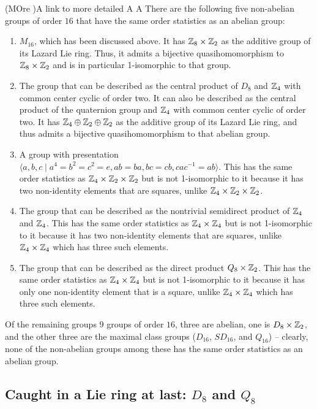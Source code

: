 \documentclass[10pt]{amsart}
\begin{document}
(MOre )A link to more detailed A A
There are the following five non-abelian groups of order $16$ that
have the same order statistics as an abelian group:

\begin{enumerate}
\item $M_{16}$, which has been discussed above. It has $\mathbb{Z}_8 \times
  \mathbb{Z}_2$ as the additive group of its Lazard Lie ring. Thus, it admits
  a bijective quasihomomorphism to $\mathbb{Z}_8 \times \mathbb{Z}_2$ and is in
  particular 1-isomorphic to that group.
\item The group that can be described as the central product of $D_8$
  and $\mathbb{Z}_4$ with common center cyclic of order two. It can also be
  described as the central product of the quaternion group and $\mathbb{Z}_4$
  with common center cyclic of order two. It has $\mathbb{Z}_4 \oplus \mathbb{Z}_2
  \oplus \mathbb{Z}_2$ as the additive group of its Lazard Lie ring, and thus
  admits a bijective quasihomomorphism to that abelian group.
\item A group with presentation $\langle a,b,c \mid a^4 = b^2 =
  c^2 = e, ab = ba, bc = cb, cac^{-1} = ab \rangle$. This has the same
  order statistics as $\mathbb{Z}_4 \times \mathbb{Z}_2 \times \mathbb{Z}_2$ but is not
  1-isomorphic to it because it has two non-identity elements that are
  squares, unlike $\mathbb{Z}_4 \times \mathbb{Z}_2 \times \mathbb{Z}_2$.
\item The group that can be described as the nontrivial semidirect
  product of $\mathbb{Z}_4$ and $\mathbb{Z}_4$. This has the same order statistics as
  $\mathbb{Z}_4 \times \mathbb{Z}_4$ but is not 1-isomorphic to it because it has two
  non-identity elements that are squares, unlike $\mathbb{Z}_4 \times \mathbb{Z}_4$
  which has three such elements.
\item The group that can be described as the direct product $Q_8
  \times \mathbb{Z}_2$. This has the same order statistics as $\mathbb{Z}_4 \times
  \mathbb{Z}_4$ but is not 1-isomorphic to it because it has only one
  non-identity element that is a square, unlike $\mathbb{Z}_4 \times \mathbb{Z}_4$
  which has three such elements.
\end{enumerate}

Of the remaining groups $9$ groups of order $16$, three are abelian,
one is $D_8 \times \mathbb{Z}_2$, and the other three are the maximal class
groups ($D_{16}$, $SD_{16}$, and $Q_{16}$) -- clearly, none of the
non-abelian groups among these has the same order statistics as an
abelian group.

\subsection{Caught in a Lie ring at last: $D_8$ and $Q_8$}
\end{document}
